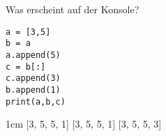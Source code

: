 \question[3]
Was erscheint auf der Konsole?
\begin{lstlisting}
a = [3,5]
b = a
a.append(5)
c = b[:]
c.append(3)
b.append(1)
print(a,b,c)
\end{lstlisting}
\begin{solutionbox}{1cm}
[3, 5, 5, 1] [3, 5, 5, 1] [3, 5, 5, 3]
\end{solutionbox}
